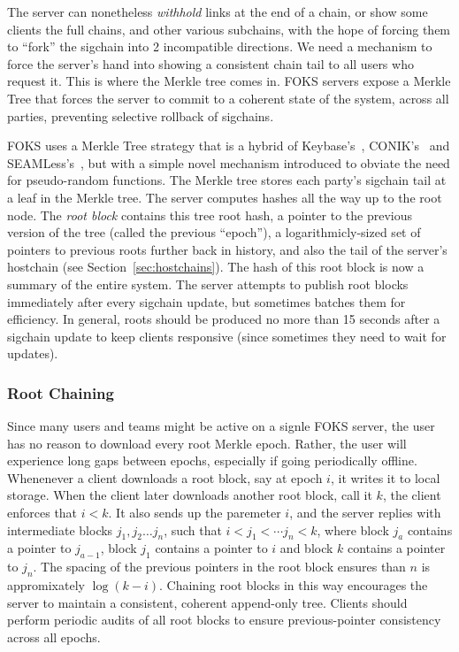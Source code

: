 The server can nonetheless \textit{withhold} links at the end of a chain, 
or show some clients the full chains, and other various subchains, with the
hope of forcing them to ``fork'' the sigchain into 2 incompatible directions.
We need a mechanism to force the server's hand into showing a consistent 
chain tail to all users who request it. This is where the Merkle tree
comes in. FOKS servers expose a Merkle Tree that forces the server to commit
to a coherent state of the system, across all parties, preventing selective
rollback of sigchains. 

FOKS uses a Merkle Tree strategy that is a hybrid of Keybase's~\cite{keybase},
CONIK's~\cite{melara2015coniks} and SEAMLess's~\cite{chase2019seemless}, but
with a simple novel mechanism introduced to obviate the need for pseudo-random
functions. The Merkle tree stores each party's sigchain tail at a leaf 
in the Merkle tree. The server computes hashes all the way up to the root node.
The \textit{root block} contains this tree root hash, a pointer to the previous version of
the tree (called the previous ``epoch''), a logarithmicly-sized set of pointers
to previous roots further back in history, and also the tail of the 
server's hostchain (see Section~\ref{sec:hostchains}). The hash of this
root block is now a summary of the entire system. The server attempts to publish
root blocks immediately after every sigchain update, but sometimes batches 
them for efficiency. In general, roots should be produced no more than
15 seconds after a sigchain update to keep clients responsive (since sometimes
they need to wait for updates).

\subsubsection{Root Chaining}

Since many users and teams might be active on a signle FOKS server, 
the user has no reason to download every root Merkle epoch. Rather,
the user will experience long gaps between epochs, especially if going
periodically offline. Whenenever a client downloads a root block,
say at epoch $i$, it writes it to local storage. When the client later
downloads another root block, call it $k$, the client enforces
that $i < k$. It also sends up the paremeter $i$, and the server
replies with intermediate blocks $j_1, j_2 \dots j_n$, such that
$i < j_1 < \cdots j_n < k$,  where block $j_{a}$ contains
a pointer to $j_{a-1}$, block $j_1$ contains a pointer to $i$
and block $k$ contains a pointer to $j_n$. The spacing of the
previous pointers in the root block ensures than $n$ is appromixately
$\log (k-i)$. Chaining root blocks in this way 
encourages the server to maintain a consistent, coherent append-only
tree. Clients should perform periodic audits of all root blocks
to ensure previous-pointer consistency across all epochs.

